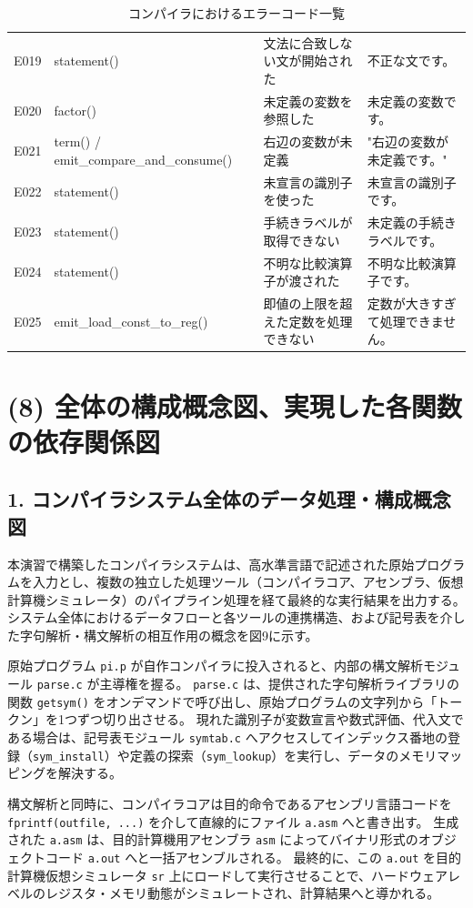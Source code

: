 \documentclass[11pt,a4paper,dvipdfmx]{bxjsarticle}
\begin{document}
\begin{table}[!ht]
\begin{tabularx}{\linewidth}{|c|>{\raggedright\arraybackslash}X|>{\raggedright\arraybackslash}X|>{\raggedright\arraybackslash}X|}
E019 & statement() & 文法に合致しない文が開始された & 不正な文です。 \\
E020 & factor() & 未定義の変数を参照した & 未定義の変数です。 \\
E021 & term() / emit\_compare\_and\_consume() & 右辺の変数が未定義 & "右辺の変数が未定義です。" \\
E022 & statement() & 未宣言の識別子を使った & 未宣言の識別子です。 \\
E023 & statement() & 手続きラベルが取得できない & 未定義の手続きラベルです。 \\
E024 & statement() & 不明な比較演算子が渡された & 不明な比較演算子です。 \\
E025 & emit\_load\_const\_to\_reg() & 即値の上限を超えた定数を処理できない & 定数が大きすぎて処理できません。 \\
\hline
\end{tabularx}
\caption{コンパイラにおけるエラーコード一覧}
\label{tab:error_codes}
\end{table}

\newpage
\section*{(8) 全体の構成概念図、実現した各関数の依存関係図}

\subsection*{1. コンパイラシステム全体のデータ処理・構成概念図}
本演習で構築したコンパイラシステムは、高水準言語で記述された原始プログラムを入力とし、複数の独立した処理ツール（コンパイラコア、アセンブラ、仮想計算機シミュレータ）のパイプライン処理を経て最終的な実行結果を出力する。
システム全体におけるデータフローと各ツールの連携構造、および記号表を介した字句解析・構文解析の相互作用の概念を図9に示す。

原始プログラム \texttt{pi.p} が自作コンパイラに投入されると、内部の構文解析モジュール \texttt{parse.c} が主導権を握る。
\texttt{parse.c} は、提供された字句解析ライブラリの関数 \texttt{getsym()} をオンデマンドで呼び出し、原始プログラムの文字列から「トークン」を1つずつ切り出させる。
現れた識別子が変数宣言や数式評価、代入文である場合は、記号表モジュール \texttt{symtab.c} へアクセスしてインデックス番地の登録（\texttt{sym\_install}）や定義の探索（\texttt{sym\_lookup}）を実行し、データのメモリマッピングを解決する。

構文解析と同時に、コンパイラコアは目的命令であるアセンブリ言語コードを \texttt{fprintf(outfile, ...)} を介して直線的にファイル \texttt{a.asm} へと書き出す。
生成された \texttt{a.asm} は、目的計算機用アセンブラ \texttt{asm} によってバイナリ形式のオブジェクトコード \texttt{a.out} へと一括アセンブルされる。
最終的に、この \texttt{a.out} を目的計算機仮想シミュレータ \texttt{sr} 上にロードして実行させることで、ハードウェアレベルのレジスタ・メモリ動態がシミュレートされ、計算結果へと導かれる。
\end{document}
